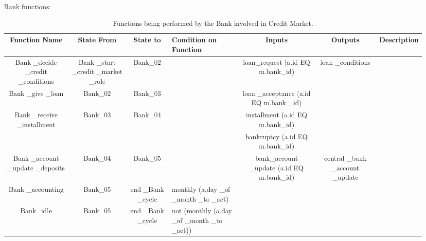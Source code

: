 Bank functions:
\begin{landscape}
\begin{table}[!htb]\caption{Functions being performed by the Bank involved in Credit Market.}
\begin{center}
\begin{tabular}{|c|c|c|l|c|c|l|}
\hline
Function Name & State From & State to & Condition on Function & Inputs & Outputs & Description \\
\hline

{\parbox[l]{3cm}{Bank \_decide \_credit \_conditions}} &
{\parbox[l]{3cm}{Bank \_start \_credit \_market \_role}} & Bank\_02
& & {\parbox[l]{3cm}{loan\_request (a.id EQ m.bank\_id)}} &
{\parbox[l]{3cm}{loan \_conditions}} &\\

\hline

{\parbox[l]{3cm}{Bank \_give \_loan}} & Bank\_02 & Bank\_03 & &
{\parbox[l]{3cm}{loan \_acceptance (a.id EQ m.bank \_id)}} &  &\\

\hline

{\parbox[l]{3cm}{Bank \_receive \_installment}} & Bank\_03 &
Bank\_04 & &
{\parbox[l]{3cm}{installment (a.id EQ m.bank\_id)}} & & \\

&&&&
{\parbox[l]{3cm}{bankruptcy (a.id EQ m.bank\_id)}} &  &\\

\hline


{\parbox[l]{3cm}{Bank \_account \_update \_deposits}} & Bank\_04 &
Bank\_05 & & {\parbox[l]{3cm}{bank\_account \_update (a.id EQ
m.bank\_id)}} &
{\parbox[l]{3cm}{central \_bank \_account \_update}} &\\

\hline


{\parbox[l]{3cm}{Bank \_accounting}} & Bank\_05 &
{\parbox[l]{3cm}{end \_Bank \_cycle}} &
{\parbox[l]{4cm}{monthly (a.day \_of \_month \_to \_act)}}&  &  &\\

\hline


{\parbox[l]{3cm}{Bank\_idle}} & Bank\_05 & {\parbox[l]{3cm}{end
\_Bank \_cycle}} &
{\parbox[l]{4cm}{not (monthly (a.day \_of \_month \_to \_act))}}&  &  &\\
\hline


\end{tabular}\end{center}\label{tab:creditbankfn}
\end{table}
\end{landscape}
